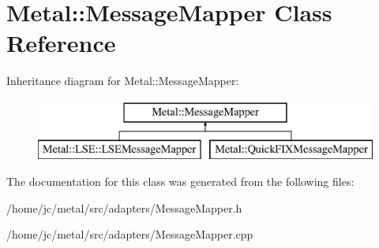 \hypertarget{classMetal_1_1MessageMapper}{}\section{Metal\+:\+:Message\+Mapper Class Reference}
\label{classMetal_1_1MessageMapper}
Inheritance diagram for Metal\+:\+:Message\+Mapper\+:\begin{figure}[H]
\begin{center}
\leavevmode
\includegraphics[height=2.000000cm]{classMetal_1_1MessageMapper}
\end{center}
\end{figure}


The documentation for this class was generated from the following files\+:\begin{DoxyCompactItemize}
\item 
/home/jc/metal/src/adapters/Message\+Mapper.\+h\item 
/home/jc/metal/src/adapters/Message\+Mapper.\+cpp\end{DoxyCompactItemize}
